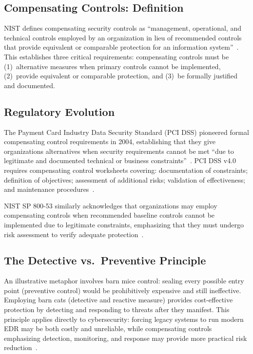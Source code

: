 \documentclass[sigconf,nonacm]{acmart}
\begin{document}
\subsection{Compensating Controls: Definition}

NIST defines compensating security controls as ``management, operational, and technical
controls employed by an organization in lieu of recommended controls that provide
equivalent or comparable protection for an information system''~\cite{nistglossary2024}.
This establishes three critical requirements: compensating controls must be
(1)~alternative measures when primary controls cannot be implemented,
(2)~provide equivalent or comparable protection, and
(3)~be formally justified and documented.

\subsection{Regulatory Evolution}

The Payment Card Industry Data Security Standard (PCI DSS) pioneered formal compensating
control requirements in 2004, establishing that they give organizations alternatives when
security requirements cannot be met ``due to legitimate and documented technical or
business constraints''~\cite{techtarget2024,fortinet2024}. PCI DSS v4.0 requires
compensating control worksheets covering: documentation of constraints; definition of
objectives; assessment of additional risks; validation of effectiveness; and maintenance
procedures~\cite{techtarget2024}.

NIST SP 800-53 similarly acknowledges that organizations may employ compensating controls
when recommended baseline controls cannot be implemented due to legitimate constraints,
emphasizing that they must undergo risk assessment to verify adequate
protection~\cite{nist2020controls,specops2022}.

\subsection{The Detective vs.\ Preventive Principle}

An illustrative metaphor involves barn mice control: sealing every possible entry point
(preventive control) would be prohibitively expensive and still ineffective. Employing
barn cats (detective and reactive measure) provides cost-effective protection by detecting
and responding to threats after they manifest. This principle applies directly to
cybersecurity: forcing legacy systems to run modern EDR may be both costly and
unreliable, while compensating controls emphasizing detection, monitoring, and response
may provide more practical risk reduction~\cite{reach2024}.
\end{document}
